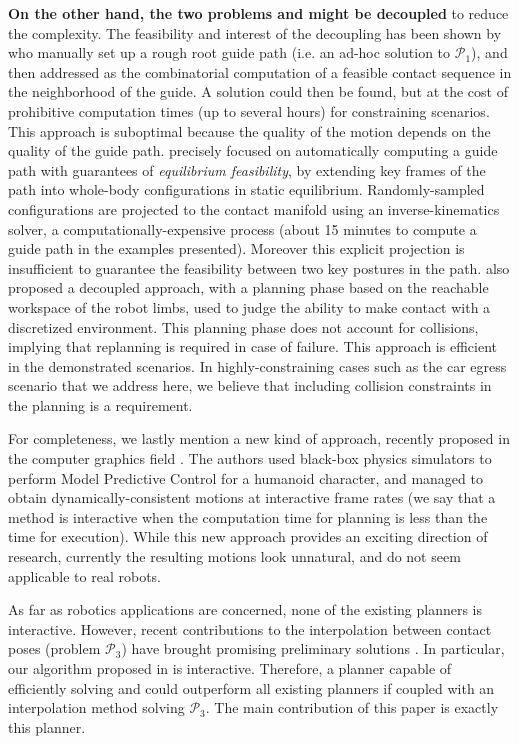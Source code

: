 \textbf{On the other hand, the two problems \Pa and \Pb might be decoupled} to reduce the complexity. The feasibility and interest of the decoupling has been shown by \citeauthor{DBLP:conf/iser/EscandeKMG08} who manually set up a rough root guide path (i.e. an ad-hoc solution to $\mathcal{P}_1$), and then addressed \Pb as the combinatorial computation of a feasible contact sequence in the neighborhood of the guide. A solution could then be found, %
but at the cost of prohibitive computation times (up to several hours) for constraining scenarios. This approach is suboptimal because the quality of the motion depends on the quality of the guide path. \citeauthor{Bouyarmane2009} precisely focused on automatically computing a guide path with guarantees of \textit{equilibrium feasibility}, by extending key frames of the path into whole-body configurations in static equilibrium. Randomly-sampled configurations are projected to the contact manifold using an inverse-kinematics solver, a computationally-expensive process (about 15 minutes to compute a guide path in the examples presented). Moreover this explicit projection is insufficient to guarantee the feasibility between two key postures in the path. \citeauthor{7140082} also proposed a decoupled approach, with a planning phase based on the reachable workspace of the robot limbs, used to judge the ability to make contact with 
a discretized environment. This planning phase does not account for collisions, implying that replanning is required in case of failure. This approach is efficient 
in the demonstrated scenarios. In highly-constraining cases such 
as the car egress scenario that we address here, we believe that including collision constraints in the planning is a requirement.

For completeness, we lastly mention a new kind of approach, recently proposed in the computer graphics field \citep{hamalainen_cpbp_2015}. The authors
used black-box physics simulators to perform Model Predictive Control for a humanoid character, and managed to obtain dynamically-consistent motions
at \gls{interactive} frame rates (we say that a method is interactive when the computation time for planning is less than the
time for execution). While this new approach provides an exciting direction of research, currently the resulting motions
look unnatural, and do not seem applicable to real robots.

As far as robotics applications are concerned, none of the existing planners is \gls{interactive}.
However, recent contributions to the interpolation between contact poses (problem $\mathcal{P}_3$) have brought promising preliminary solutions \citep{Hauser2014, herzog2015trajectory, Park116, Carpentier2016}. In particular, our algorithm proposed in \citeauthor{Carpentier2016} is \gls{interactive}.
Therefore, a planner capable of efficiently solving \Pa and \Pb could outperform all existing planners if coupled with an interpolation method solving $\mathcal{P}_3$.
The main contribution of this paper is exactly this planner.


